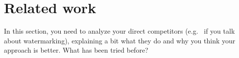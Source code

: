 \section{Related work}\label{sec:related_work}

In this section, you need to analyze your direct competitors (e.g.~\cite{adi_watermarking} if you talk about watermarking), explaining a bit what they do and why you think your approach is better. What has been tried before? 